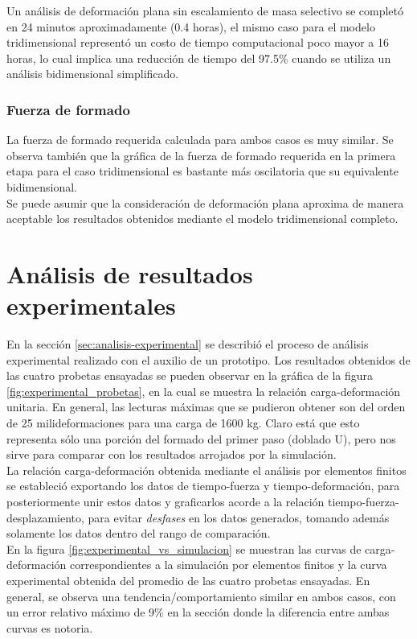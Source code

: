 Un análisis de deformación plana sin escalamiento de masa selectivo se completó en 24 minutos 
aproximadamente (0.4 horas), el mismo caso para el modelo tridimensional representó 
un costo de tiempo computacional poco mayor a 16 horas, lo cual implica una reducción de tiempo 
del 97.5\% cuando se utiliza un análisis bidimensional simplificado.

\subsubsection{Fuerza de formado}

La fuerza de formado requerida calculada para ambos casos es muy similar. Se observa también 
que la gráfica de la fuerza de formado requerida en la primera etapa para el caso tridimensional 
es bastante más oscilatoria que su equivalente bidimensional.\\

Se puede asumir que la consideración de deformación plana aproxima de manera aceptable 
los resultados obtenidos mediante el modelo tridimensional completo.

\section{Análisis de resultados experimentales }

En la sección \ref{sec:analisis-experimental} se describió el proceso de análisis experimental 
realizado con el auxilio de un prototipo. Los resultados obtenidos de las cuatro probetas 
ensayadas se pueden observar en la gráfica de la figura \ref{fig:experimental_probetas}, en 
la cual se muestra la relación carga-deformación unitaria. 
En general, las lecturas máximas que se pudieron obtener son del orden de 25 milideformaciones 
para una carga de 1600 kg. Claro está que esto representa sólo una porción del formado del primer 
paso (doblado U), pero nos sirve para comparar con los resultados arrojados por la simulación.\\

La relación carga-deformación obtenida mediante el análisis por elementos finitos se estableció 
exportando los datos de tiempo-fuerza y tiempo-deformación, para posteriormente unir estos datos 
y graficarlos acorde a la relación tiempo-fuerza-desplazamiento, para evitar \textit{desfases} en 
los datos generados, tomando además solamente los datos dentro del rango de comparación.\\

En la figura \ref{fig:experimental_vs_simulacion} se muestran las curvas de carga-deformación 
correspondientes a la simulación por elementos finitos y la curva experimental obtenida del 
promedio de las cuatro probetas ensayadas. En general, se observa una tendencia/comportamiento 
similar en ambos casos, con un error relativo máximo de 9\% en la sección donde la diferencia 
entre ambas curvas es notoria.

